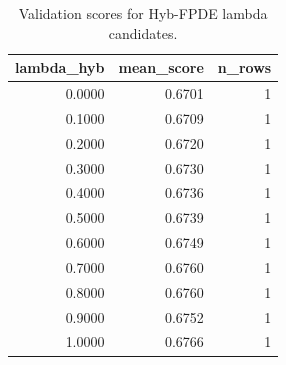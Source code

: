 \begin{table}[t]
\caption{Validation scores for Hyb-FPDE lambda candidates.}
\label{tab:lambda_distribution_computed}
\centering
\begin{tabular}{rrr}
\toprule
lambda\_hyb & mean\_score & n\_rows \\
\midrule
0.0000 & 0.6701 & 1 \\
0.1000 & 0.6709 & 1 \\
0.2000 & 0.6720 & 1 \\
0.3000 & 0.6730 & 1 \\
0.4000 & 0.6736 & 1 \\
0.5000 & 0.6739 & 1 \\
0.6000 & 0.6749 & 1 \\
0.7000 & 0.6760 & 1 \\
0.8000 & 0.6760 & 1 \\
0.9000 & 0.6752 & 1 \\
1.0000 & 0.6766 & 1 \\
\bottomrule
\end{tabular}

\end{table}

